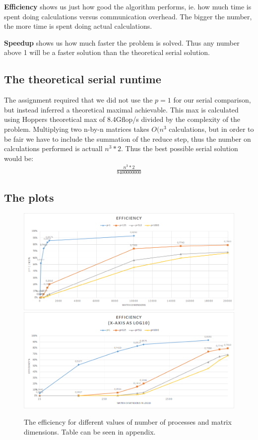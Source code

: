 \documentclass[a4paper,11pt,oneside]{book}
\begin{document}
\textbf{Efficiency} shows us just how good the algorithm performs, ie. how much time is spent doing calculations versus communication overhead. The bigger the number, the more time is spent doing actual calculations.

\textbf{Speedup} shows us how much faster the problem is solved. Thus any number above 1 will be a faster solution than the theoretical serial solution.

\subsection{The theoretical serial runtime}
The assignment required that we did not use the $p=1$ for our serial comparison, but instead inferred a theoretical maximal achievable. This max is calculated using Hoppers theoretical max of 8.4Gflop/s divided by the complexity of the problem. Multiplying two n-by-n matrices takes $O(n^{3}$ calculations, but in order to be fair we have to include the summation of the reduce step, thus the number on calculations performed is actuall $n^{3} * 2$. Thus the best possible serial solution would be:
\begin{align*}
\frac{n^{3}*2}{8400000000}
\end{align*}

\subsection{The plots}

\begin{figure}[H]
  \centering
  \includegraphics[width=0.9\linewidth]{plots-eff2.png}
  \includegraphics[width=0.9\linewidth]{plots-eff1.png}
  \caption{The efficiency for different values of number of processes and matrix dimensions. Table can be seen in appendix.}
  \centering
  \label{fig:sub1}
\end{figure}
\end{document}
